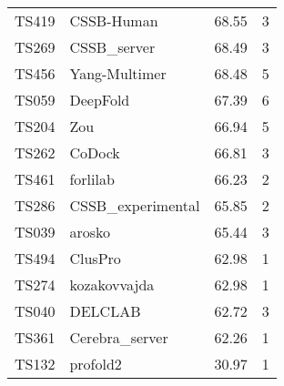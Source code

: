 \begin{table}[ht]
{\begin{tabular}{llrr}
TS419 & CSSB-Human & 68.55 & 3 \\ 
TS269 & CSSB\_server & 68.49 & 3 \\ 
TS456 & Yang-Multimer & 68.48 & 5 \\ 
TS059 & DeepFold & 67.39 & 6 \\ 
TS204 & Zou & 66.94 & 5 \\ 
TS262 & CoDock & 66.81 & 3 \\ 
TS461 & forlilab & 66.23 & 2 \\ 
TS286 & CSSB\_experimental & 65.85 & 2 \\ 
TS039 & arosko & 65.44 & 3 \\ 
TS494 & ClusPro & 62.98 & 1 \\ 
TS274 & kozakovvajda & 62.98 & 1 \\ 
TS040 & DELCLAB & 62.72 & 3 \\ 
TS361 & Cerebra\_server & 62.26 & 1 \\ 
TS132 & profold2 & 30.97 & 1 \\ 
\bottomrule
\end{tabular}%
}
\end{table}
